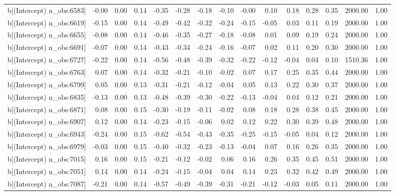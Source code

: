 \begin{table}[ht]
\begin{tabular}{rrrrrrrrrrrrrrr}
  b[(Intercept) n\_obs:6583] & -0.00 & 0.00 & 0.14 & -0.35 & -0.28 & -0.18 & -0.10 & -0.00 & 0.10 & 0.18 & 0.28 & 0.35 & 2000.00 & 1.00 \\ 
  b[(Intercept) n\_obs:6619] & -0.15 & 0.00 & 0.14 & -0.49 & -0.42 & -0.32 & -0.24 & -0.15 & -0.05 & 0.03 & 0.11 & 0.19 & 2000.00 & 1.00 \\ 
  b[(Intercept) n\_obs:6655] & -0.08 & 0.00 & 0.14 & -0.46 & -0.35 & -0.27 & -0.18 & -0.08 & 0.01 & 0.09 & 0.19 & 0.24 & 2000.00 & 1.00 \\ 
  b[(Intercept) n\_obs:6691] & -0.07 & 0.00 & 0.14 & -0.43 & -0.34 & -0.24 & -0.16 & -0.07 & 0.02 & 0.11 & 0.20 & 0.30 & 2000.00 & 1.00 \\ 
  b[(Intercept) n\_obs:6727] & -0.22 & 0.00 & 0.14 & -0.56 & -0.48 & -0.39 & -0.32 & -0.22 & -0.12 & -0.04 & 0.04 & 0.10 & 1510.36 & 1.00 \\ 
  b[(Intercept) n\_obs:6763] & 0.07 & 0.00 & 0.14 & -0.32 & -0.21 & -0.10 & -0.02 & 0.07 & 0.17 & 0.25 & 0.35 & 0.44 & 2000.00 & 1.00 \\ 
  b[(Intercept) n\_obs:6799] & 0.05 & 0.00 & 0.13 & -0.31 & -0.21 & -0.12 & -0.04 & 0.05 & 0.13 & 0.22 & 0.30 & 0.37 & 2000.00 & 1.00 \\ 
  b[(Intercept) n\_obs:6835] & -0.13 & 0.00 & 0.13 & -0.48 & -0.39 & -0.30 & -0.22 & -0.13 & -0.04 & 0.04 & 0.12 & 0.21 & 2000.00 & 1.00 \\ 
  b[(Intercept) n\_obs:6871] & 0.08 & 0.00 & 0.15 & -0.30 & -0.19 & -0.11 & -0.02 & 0.08 & 0.18 & 0.28 & 0.38 & 0.45 & 2000.00 & 1.00 \\ 
  b[(Intercept) n\_obs:6907] & 0.12 & 0.00 & 0.14 & -0.23 & -0.15 & -0.06 & 0.02 & 0.12 & 0.22 & 0.30 & 0.39 & 0.48 & 2000.00 & 1.00 \\ 
  b[(Intercept) n\_obs:6943] & -0.24 & 0.00 & 0.15 & -0.62 & -0.54 & -0.43 & -0.35 & -0.25 & -0.15 & -0.05 & 0.04 & 0.12 & 2000.00 & 1.00 \\ 
  b[(Intercept) n\_obs:6979] & -0.03 & 0.00 & 0.15 & -0.40 & -0.32 & -0.23 & -0.13 & -0.04 & 0.07 & 0.16 & 0.26 & 0.35 & 2000.00 & 1.00 \\ 
  b[(Intercept) n\_obs:7015] & 0.16 & 0.00 & 0.15 & -0.21 & -0.12 & -0.02 & 0.06 & 0.16 & 0.26 & 0.35 & 0.45 & 0.51 & 2000.00 & 1.00 \\ 
  b[(Intercept) n\_obs:7051] & 0.14 & 0.00 & 0.14 & -0.24 & -0.15 & -0.04 & 0.04 & 0.14 & 0.23 & 0.32 & 0.42 & 0.49 & 2000.00 & 1.00 \\ 
  b[(Intercept) n\_obs:7087] & -0.21 & 0.00 & 0.14 & -0.57 & -0.49 & -0.39 & -0.31 & -0.21 & -0.12 & -0.03 & 0.05 & 0.11 & 2000.00 & 1.00 \\ 

\end{tabular}
\end{table}
